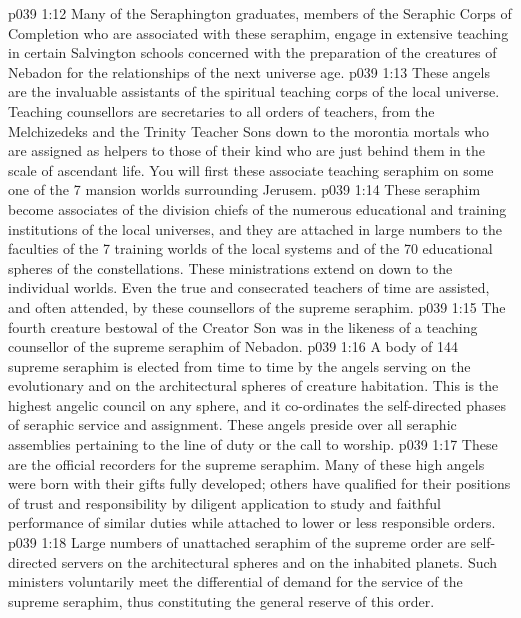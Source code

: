 \vs p039 1:12 Many of the Seraphington graduates, members of the Seraphic Corps of Completion who are associated with these seraphim, engage in extensive teaching in certain Salvington schools concerned with the preparation of the creatures of Nebadon for the relationships of the next universe age.
\vs p039 1:13 \bibnobreakspace {} These angels are the invaluable assistants of the spiritual teaching corps of the local universe. Teaching counsellors are secretaries to all orders of teachers, from the Melchizedeks and the Trinity Teacher Sons down to the morontia mortals who are assigned as helpers to those of their kind who are just behind them in the scale of ascendant life. You will first  these associate teaching seraphim on some one of the 7 mansion worlds surrounding Jerusem.
\vs p039 1:14 These seraphim become associates of the division chiefs of the numerous educational and training institutions of the local universes, and they are attached in large numbers to the faculties of the 7 training worlds of the local systems and of the 70 educational spheres of the constellations. These ministrations extend on down to the individual worlds. Even the true and consecrated teachers of time are assisted, and often attended, by these counsellors of the supreme seraphim.
\vs p039 1:15 The fourth creature bestowal of the Creator Son was in the likeness of a teaching counsellor of the supreme seraphim of Nebadon.
\vs p039 1:16 \bibnobreakspace {} A body of 144 supreme seraphim is elected from time to time by the angels serving on the evolutionary and on the architectural spheres of creature habitation. This is the highest angelic council on any sphere, and it co\hyp{}ordinates the self\hyp{}directed phases of seraphic service and assignment. These angels preside over all seraphic assemblies pertaining to the line of duty or the call to worship.
\vs p039 1:17 \bibnobreakspace {} These are the official recorders for the supreme seraphim. Many of these high angels were born with their gifts fully developed; others have qualified for their positions of trust and responsibility by diligent application to study and faithful performance of similar duties while attached to lower or less responsible orders.
\vs p039 1:18 \bibnobreakspace {} Large numbers of unattached seraphim of the supreme order are self\hyp{}directed servers on the architectural spheres and on the inhabited planets. Such ministers voluntarily meet the differential of demand for the service of the supreme seraphim, thus constituting the general reserve of this order.

